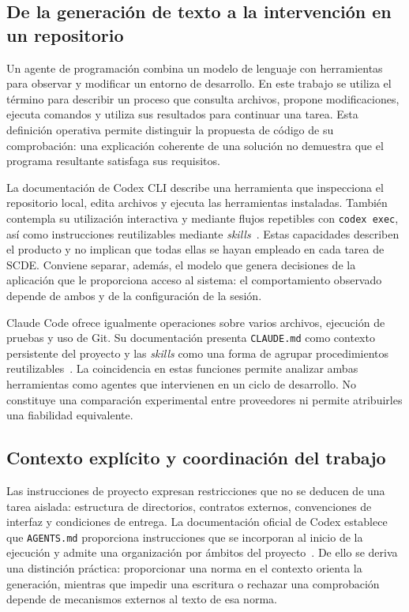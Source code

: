 \subsection{De la generación de texto a la intervención en un repositorio}

Un agente de programación combina un modelo de lenguaje con herramientas para
observar y modificar un entorno de desarrollo. En este trabajo se utiliza el
término para describir un proceso que consulta archivos, propone modificaciones,
ejecuta comandos y utiliza sus resultados para continuar una tarea. Esta
definición operativa permite distinguir la propuesta de código de su comprobación:
una explicación coherente de una solución no demuestra que el programa resultante
satisfaga sus requisitos.

La documentación de Codex CLI describe una herramienta que inspecciona el
repositorio local, edita archivos y ejecuta las herramientas instaladas. También
contempla su utilización interactiva y mediante flujos repetibles con
\texttt{codex exec}, así como instrucciones reutilizables mediante
\textit{skills}~\cite{codex_cli_agents_2026}. Estas capacidades describen el
producto y no implican que todas ellas se hayan empleado en cada tarea de SCDE.
Conviene separar, además, el modelo que genera decisiones de la aplicación que
le proporciona acceso al sistema: el comportamiento observado depende de ambos
y de la configuración de la sesión.

Claude Code ofrece igualmente operaciones sobre varios archivos, ejecución de
pruebas y uso de Git. Su documentación presenta \texttt{CLAUDE.md} como contexto
persistente del proyecto y las \textit{skills} como una forma de agrupar
procedimientos reutilizables~\cite{codex_claude_overview_2026}. La coincidencia en
estas funciones permite analizar ambas herramientas como agentes que intervienen
en un ciclo de desarrollo. No constituye una comparación experimental entre
proveedores ni permite atribuirles una fiabilidad equivalente.

\subsection{Contexto explícito y coordinación del trabajo}

Las instrucciones de proyecto expresan restricciones que no se deducen de una
tarea aislada: estructura de directorios, contratos externos, convenciones de
interfaz y condiciones de entrega. La documentación oficial de Codex establece
que \texttt{AGENTS.md} proporciona instrucciones que se incorporan al inicio de
la ejecución y admite una organización por ámbitos del
proyecto~\cite{codex_agents_instructions_2026}. De ello se deriva una distinción
práctica: proporcionar una norma en el contexto orienta la generación, mientras
que impedir una escritura o rechazar una comprobación depende de mecanismos
externos al texto de esa norma.

